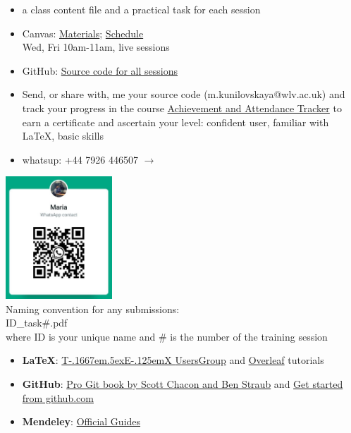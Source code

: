 \documentclass[a4paper,12pt]{article} %
\def\TeX{{\rm T\kern-.1667em\lower.5ex\hbox{E}\kern-.125emX }}
\begin{document}
\begin{center}
\begin{tcolorbox}[width=\textwidth, colback={yellow!40!white}, title={\textbf{Housekeeping}}, colbacktitle=yellow!60!white, coltitle=black]
\begin{multicols}{2}
		\begin{itemize}
			\item a class content file and a practical task for each session
			\item Canvas: \href{https://canvas.wlv.ac.uk/courses/33429/files/folder/latex_mendeley_github}{Materials}; \href{https://wlv.instructure.com/courses/33429/pages/latex-and-mendeley-workshop}{Schedule} \\ Wed, Fri 10am-11am, live sessions
			\item GitHub: \href{https://github.com/kunilovskaya/dskills_workshop}{Source code for all sessions} 
			\item Send, or share with, me your source code (m.kunilovskaya@wlv.ac.uk) and track your progress in the course \href{https://docs.google.com/document/d/1XKaCl3-tRkNfoy1w6dSrqrQBBLLrpnnLBt1zi5KXec0/edit?usp=sharing}{Achievement and Attendance Tracker} to earn a certificate and ascertain your level: confident user, familiar with LaTeX, basic skills
			\item whatsup: +44 7926 446507 $\rightarrow$
		\end{itemize}
	
		\columnbreak
		
		\centering
		 \includegraphics[width=40mm]{pics/maria_ku_whatsup_contact} \\
		Naming convention for any submissions: \\
		ID\_task\#.pdf \\
		where 
		ID is your unique name and 
		\# is the number of the training session
	 
	\end{multicols}
\end{tcolorbox}%

\bigskip

\begin{tcolorbox}[width=\textwidth, colback={white}, title={\textbf{Recommended resources}}, colbacktitle=white, coltitle=black]
	\begin{itemize}
	\item \textbf{LaTeX}: \href{https://tug.org/begin.html}{\TeX UsersGroup} and \href{https://www.overleaf.com/learn/latex/Learn_LaTeX_in_30_minutes}{Overleaf} tutorials
	\item \textbf{GitHub}: \href{https://git-scm.com/book/en/v2}{Pro Git book by Scott Chacon and Ben Straub} and \href{https://docs.github.com/en/get-started}{Get started from github.com}
	\item \textbf{Mendeley}: \href{https://www.mendeley.com/guides}{Official Guides}
	

\end{itemize}
\end{tcolorbox}
\end{center}
\end{document}
